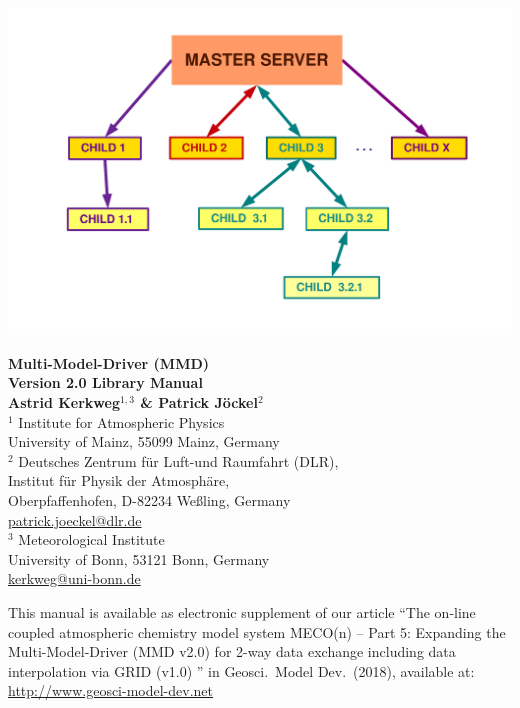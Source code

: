 \documentclass[twoside]{article}
\begin{document}
\thispagestyle{empty}
\vspace*{-1.5cm}
\begin{center}
 \includegraphics[width=\textwidth]{MMDlib_SC_hierarchy.pdf} 

  {\Huge\bf Multi-Model-Driver (MMD) \\Version 2.0 Library Manual}\\[12mm]

  {\huge\bf Astrid Kerkweg$^{1,3}$ \& Patrick J\"ockel$^2$ }\\[5mm]

  \large
  $^1$ Institute for Atmospheric Physics\\
  University of Mainz, 55099 Mainz, Germany\\
  $^2$ Deutsches Zentrum f\"ur Luft-und Raumfahrt (DLR),\\
   Institut f\"ur Physik der Atmosph\"are, \\
    Oberpfaffenhofen, D-82234 We\ss ling, Germany \\
  \url{patrick.joeckel@dlr.de}\\
  $^3$ Meteorological Institute\\
  University of Bonn, 53121 Bonn, Germany\\
  \url{kerkweg@uni-bonn.de}\\

\end{center}

\vfill

{\large This manual is available as electronic supplement of our article
  ``The on-line coupled atmospheric chemistry model system MECO(n)
  – Part 5: Expanding the Multi-Model-Driver (MMD v2.0) for 2-way data
  exchange including data interpolation via GRID (v1.0) '' 
  in Geosci.\ Model Dev.\ 
  (2018), available at: \url{http://www.geosci-model-dev.net}}
\end{document}
